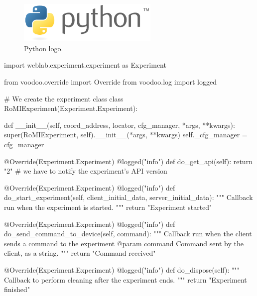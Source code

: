 \begin{figure}[!htbp]
	\centering
	\includegraphics[width=0.6\textwidth]{fig/python}
	\caption{Python logo.}
	\label{fig:python}
\end{figure}

\clearpage
\begin{center}
\begin{minipage}{.9\textwidth}
\singlespace
{}
\begin{pyglist}[language=python, caption={WebLab experiment server development.},
	label={alg:weblab_server_api}, listingname={Algorithm}, numbers=left]
import weblab.experiment.experiment as Experiment

from voodoo.override import Override
from voodoo.log import logged

# We create the experiment class
class RoMIExperiment(Experiment.Experiment):

    def __init__(self, coord_address, locator, cfg_manager,
    *args, **kwargs):
        super(RoMIExperiment, self).__init__(*args, **kwargs)
        self._cfg_manager = cfg_manager

    @Override(Experiment.Experiment)
    @logged("info")
    def do_get_api(self):
        return "2" # we have to notify the experiment's API version

    @Override(Experiment.Experiment)
    @logged("info")
    def do_start_experiment(self, client_initial_data,
    server_initial_data):
        """
        Callback run when the experiment is started.
        """
        return "Experiment started"

    @Override(Experiment.Experiment)
    @logged("info")
    def do_send_command_to_device(self, command):
        """
        Callback run when the client sends a command to the experiment
        @param command Command sent by the client, as a string.
        """
        return "Command received"

    @Override(Experiment.Experiment)
    @logged("info")
    def do_dispose(self):
        """
        Callback to perform cleaning after the experiment ends.
        """
        return "Experiment finished"
\end{pyglist}
\end{minipage}
\end{center}
\clearpage

